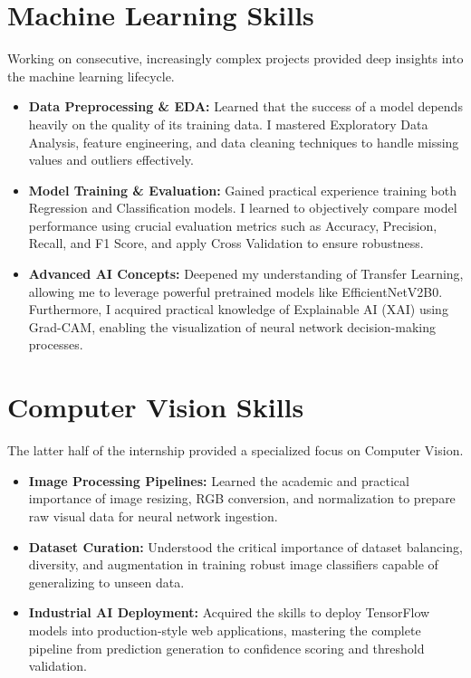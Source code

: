\section{Machine Learning Skills}

Working on consecutive, increasingly complex projects provided deep insights into the machine learning lifecycle.

\begin{itemize}[leftmargin=1.5cm]
    \item \textbf{Data Preprocessing \& EDA:} Learned that the success of a model depends heavily on the quality of its training data. I mastered Exploratory Data Analysis, feature engineering, and data cleaning techniques to handle missing values and outliers effectively.
    \item \textbf{Model Training \& Evaluation:} Gained practical experience training both Regression and Classification models. I learned to objectively compare model performance using crucial evaluation metrics such as Accuracy, Precision, Recall, and F1 Score, and apply Cross Validation to ensure robustness.
    \item \textbf{Advanced AI Concepts:} Deepened my understanding of Transfer Learning, allowing me to leverage powerful pretrained models like EfficientNetV2B0. Furthermore, I acquired practical knowledge of Explainable AI (XAI) using Grad-CAM, enabling the visualization of neural network decision-making processes.
\end{itemize}

\section{Computer Vision Skills}

The latter half of the internship provided a specialized focus on Computer Vision.

\begin{itemize}[leftmargin=1.5cm]
    \item \textbf{Image Processing Pipelines:} Learned the academic and practical importance of image resizing, RGB conversion, and normalization to prepare raw visual data for neural network ingestion.
    \item \textbf{Dataset Curation:} Understood the critical importance of dataset balancing, diversity, and augmentation in training robust image classifiers capable of generalizing to unseen data.
    \item \textbf{Industrial AI Deployment:} Acquired the skills to deploy TensorFlow models into production-style web applications, mastering the complete pipeline from prediction generation to confidence scoring and threshold validation.
\end{itemize}

